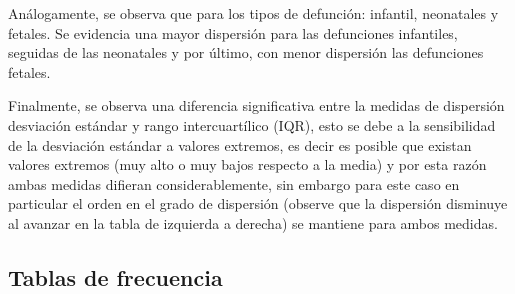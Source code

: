 \documentclass[
  letterpaper,
  onepage,
  openany]{report}
\begin{document}
Análogamente, se observa que para los tipos de defunción: infantil,
neonatales y fetales. Se evidencia una mayor dispersión para las
defunciones infantiles, seguidas de las neonatales y por último, con
menor dispersión las defunciones fetales.

Finalmente, se observa una diferencia significativa entre la medidas de
dispersión desviación estándar y rango intercuartílico (IQR), esto se
debe a la sensibilidad de la desviación estándar a valores extremos, es
decir es posible que existan valores extremos (muy alto o muy bajos
respecto a la media) y por esta razón ambas medidas difieran
considerablemente, sin embargo para este caso en particular el orden en
el grado de dispersión (observe que la dispersión disminuye al avanzar
en la tabla de izquierda a derecha) se mantiene para ambos medidas.

\newpage

\hypertarget{tablas-de-frecuencia}{%
\subsection{Tablas de frecuencia}\label{tablas-de-frecuencia}}
\end{document}
